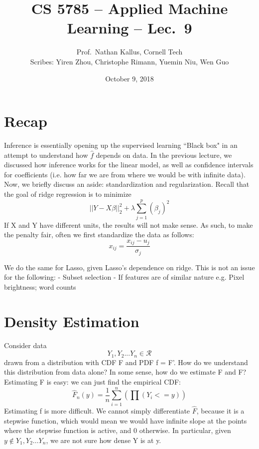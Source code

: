 \documentclass[a4paper]{article}
\title{CS 5785 -- Applied Machine Learning -- Lec.\ 9}
\author{Prof.\ Nathan Kallus, Cornell Tech\\Scribes: Yiren Zhou, Christophe Rimann, Yuemin Niu, Wen Guo}
\date{October 9, 2018}
\begin{document}
\maketitle

\section{Recap}
Inference is essentially opening up the supervised learning ``Black box" in an attempt to understand how $\hat{f}$ depends on data. In the previous lecture, we discussed how inference works for the linear model, as well as confidence intervals for coefficients (i.e. how far we are from where we would be with infinite data).\\


Now, we briefly discuss an aside: standardization and regularization. Recall that the goal of ridge regression is to minimize $$||Y-X\beta||_{2}^2+\lambda\sum_{j=1}^p(\beta_{j})^2$$
If X and Y have different units, the results will not make sense. As such, to make the penalty fair, often we first standardize the data as follows:
$$x_{ij} = \frac{x_{ij}-u_j}{\sigma_j}$$

We do the same for Lasso, given Lasso's dependence on ridge.\newline
This is not an issue for the following: \newline
- Subset selection \newline
- If features are of similar nature e.g. Pixel brightness; word counts 
\newline

\section{Density Estimation}
Consider data $$Y_{1},Y_{2}...Y_{n}\in\mathcal{R}$$ drawn from a distribution with CDF F and PDF f = F'. How do we understand this distribution from data alone? In some sense, how do we estimate F and F?\newline
Estimating F is easy: we can just find the empirical CDF: $$\hat{F}_{n}(y)=\frac{1}{n}\sum_{i=1}^n(\prod(Y_{i}<=y))$$\newline
Estimating f is more difficult. We cannot simply differentiate $\hat{F}$, because it is a stepwise function, which would mean we would have infinite slope at the points where the stepwise function is active, and 0 otherwise. In particular, given $y\not\in Y_{1},Y_{2}...Y_{n}$, we are not sure how dense Y is at y.
\end{document}
